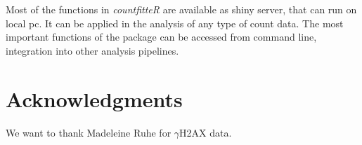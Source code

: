 Most of the functions in \emph{countfitteR} are available as shiny server, that can run on local pc. It can be applied in the analysis of any type of count data. The most important functions of the package can be accessed from command line, integration into other analysis pipelines.

\section{Acknowledgments}

We want to thank Madeleine Ruhe for $\gamma$H2AX data.



\address{Jaros\l{}aw Chilimoniuk\\
  University of Wroc\l{}aw\\
  Pl. Uniwersytecki 1, Wroc\l{}aw\\
  Poland\\
  ORCiD: 0000-0001-5467-018X\\
  }

\address{Alicja Gosiewska\\
  Warsaw University of Technology\\
  Pl. Politechniki 1, Warszawa\\
  Poland\\
  ORCiD: 0000-0001-8926-582X\\
  }


\address{Stefan R\"{o}diger (corresponding author)\\
  Brandenburg University of Technology Cottbus - Senftenberg\\
  Universit\"atsplatz 1, Senftenberg\\
  Germany\\
  ORCiD: 0000-0002-1441-6512\\
  }

\address{Micha\l{} Burdukiewicz (corresponding author)\\
  Warsaw University of Technology\\
  Pl. Politechniki 1, Warszawa\\
  Poland\\
  ORCiD: 0000-0001-8926-582X\\
  }
